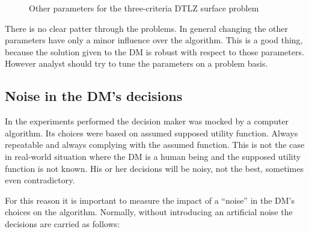 \begin{figure}
{{    }
  }
  \caption{Other parameters for the three-criteria DTLZ surface problem}
  \label{params2}
\end{figure}

There is no clear patter through the problems. In general changing the other
parameters have only a minor influence over the algorithm. This is a good
thing, because the solution given to the DM is robust with respect to those
parameters. However analyst should try to tune the parameters on a problem
basis.

\subsection{Noise in the DM's decisions}

In the experiments performed the decision maker was mocked by a computer
algorithm. Its choices were based on assumed supposed utility function. Always
repeatable and always complying with the assumed function. This is not the
case in real-world situation where the DM is a human being and the supposed
utility function is not known. His or her decisions will be noisy, not the
best, sometimes even contradictory.

For this reason it is important to measure the impact of a ``noise'' in the
DM's choices on the algorithm. Normally, without introducing an artificial
noise the decisions are carried as follows:

